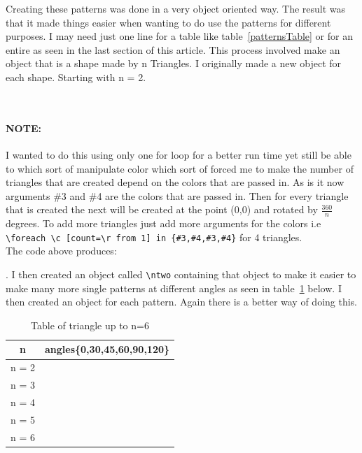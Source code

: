 \documentclass[11pt]{article}
\begin{document}
Creating these patterns was done in a very object oriented way. The result
was that it made things easier when wanting to do use the patterns for different
purposes. I may need just one line for a table like table~\ref{patternsTable}
or for an entire as seen in the last section of this article. This process 
involved make an object that is a shape made by n Triangles. I originally made 
a new object for each shape. Starting with n = 2.\\
\bigskip
{}
\bigskip
\\
\paragraph{NOTE:}
I wanted to do this using only one for loop for a better run time yet still be able to which sort of 
manipulate color which sort of forced me to make the number of triangles that are created depend
on the colors that are passed in. As is it now arguments \#3 and \#4 are the colors that are passed
in. Then for every triangle that is created the next will be created at the point (0,0) and rotated
by $\frac{360}{n}$ degrees. To add more triangles just add more arguments for the colors i.e 
\verb|\foreach \c [count=\r from 1] in {#3,#4,#3,#4}| for 4 triangles.\\
The code above produces:
.\quad
I then created an object called \verb|\ntwo| containing that object to make it easier to make many more
single patterns at different angles as seen in table~\ref{nTriangles} below. I then created an object for
each pattern. Again there is a better way of doing this. 

\bigskip
\begin{table}[H]
	\centering
	\begin{tabular}{|c| l|}
		\hline
		\textbf{n} & \textbf{angles\{0,30,45,60,90,120\}}\\%
		\hline
		n = 2 &  \ntwo\\
		\hline
		n = 3 &  \nthree\\
		\hline
		n = 4 &  \nfour\\
		\hline
		n = 5 &  \nfive\\
		\hline
		n = 6 &  \nsix\\
		\hline
	\end{tabular}
	\caption{Table of triangle up to n=6}\label{nTriangles}
\end{table}
\bigskip
\end{document}
